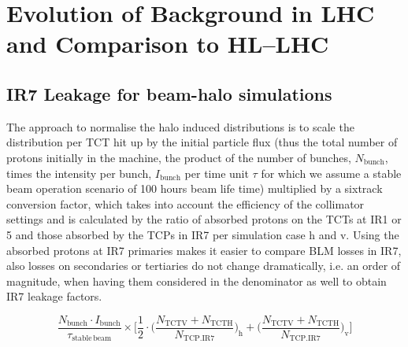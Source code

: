\section{Evolution of Background in LHC and Comparison to HL--LHC\label{evolut}}

\subsection{IR7 Leakage for beam-halo simulations}
The approach to normalise the halo induced distributions is to scale the distribution per TCT hit up by the initial particle flux (thus the total number of protons initially in the machine, the product of the number of bunches, $N_{\mathrm{bunch}}$, times the intensity per bunch, $I_{\mathrm{bunch}}$ per time unit $\tau$ for which we assume a stable beam operation scenario of 100 hours beam life time) multiplied by a sixtrack conversion factor, which takes into account the efficiency of the collimator settings and is calculated by the ratio of absorbed protons on the TCTs at IR1 or 5 and those absorbed by the TCPs in IR7 per simulation case h and v. Using the absorbed protons at IR7 primaries makes it easier to compare BLM losses in IR7, also losses on secondaries or tertiaries do not change dramatically, i.e. an order of magnitude, when having them considered in the denominator as well to obtain IR7 leakage factors.

\begin{equation} \label{eq3}
\frac{N_{\mathrm{bunch}} \cdot I_{\mathrm{bunch}}}{\tau_{\mathrm{stable \, beam}}} \times \Bigg[ \frac{1}{2} \cdot \Big( \frac{N_{\mathrm{TCTV}} + N_{\mathrm{TCTH}}}{N_{\mathrm{TCP.IR7}}}\Big)_{\mathrm{h}} + \Big( \frac{N_{\mathrm{TCTV}} + N_{\mathrm{TCTH}}}{N_{\mathrm{TCP.IR7}}} \Big)_{\mathrm{v}}  \Bigg]
\end{equation}

